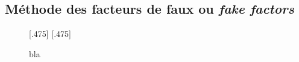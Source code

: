 \subsection{Méthode des facteurs de faux ou \emph{fake factors}}\label{chapter-HTT_analysis-section-bg_estimation-FF_method}


\begin{figure}
\centering

[.475\textwidth]
{}
\hfill
{}[.475\textwidth]
{}

\caption{bla}
\end{figure}